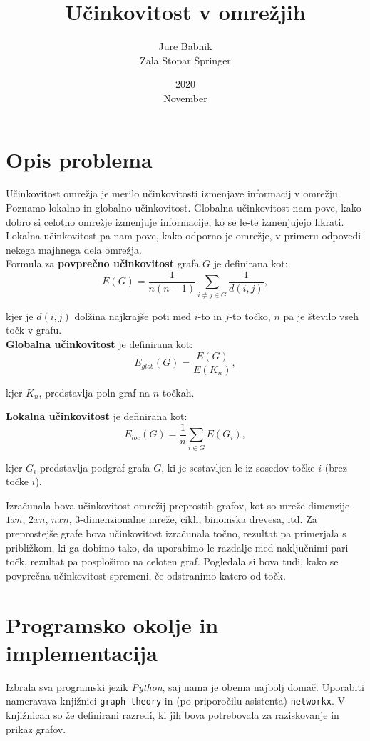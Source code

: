\documentclass[a4paper, 16pt]{article}
\title{Učinkovitost v omrežjih}
\date{2020\\ November}
\author{Jure Babnik \\  Zala Stopar Špringer}
\begin{document}
\maketitle

\section{Opis problema}

Učinkovitost omrežja je merilo učinkovitosti izmenjave informacij v omrežju. Poznamo lokalno in globalno učinkovitost. Globalna učinkovitost nam pove, kako dobro si celotno omrežje
izmenjuje informacije, ko se le-te izmenjujejo hkrati. Lokalna učinkovitost pa nam pove, kako odporno je omrežje, v primeru odpovedi nekega majhnega dela omrežja.\\

Formula za \textbf{povprečno učinkovitost} grafa $G$ je definirana kot:
$$ E(G) = \frac{1}{n(n-1)} \sum_{i\neq j \in G} \frac{1}{d(i,j)},$$

kjer je $d(i,j)$ dolžina najkrajše poti med $i$-to in $j$-to točko, $n$ pa je število vseh točk v grafu.\\

\textbf{Globalna učinkovitost} je definirana kot:
$$ E_{glob}(G) = \frac{E(G)}{E(K_n)}, $$

kjer $K_n$, predstavlja poln graf na $n$ točkah.


\textbf{Lokalna učinkovitost} je definirana kot:
$$ E_{loc}(G) = \frac{1}{n} \sum_{i \in G} E(G_i), $$

kjer $G_i$ predstavlja podgraf grafa $G$, ki je sestavljen le iz sosedov točke $i$ (brez točke $i$).

Izračunala bova učinkovitost omrežij preprostih grafov, kot so mreže dimenzije $1 x n$, $2 x n$, $n x n$, 3-dimenzionalne mreže, cikli, binomska drevesa, itd.
Za preprostejše grafe bova učinkovitost izračunala točno, rezultat pa primerjala s približkom, ki ga dobimo tako, da uporabimo le razdalje med naključnimi pari točk, 
rezultat pa posplošimo na celoten graf. Pogledala si bova tudi, kako se povprečna učinkovitost spremeni, če odstranimo katero od točk. 

\section{Programsko okolje in implementacija}

Izbrala sva programski jezik \emph{Python}, saj nama je obema najbolj domač. Uporabiti nameravava knjižnici \texttt{graph-theory} in (po priporočilu asistenta) \texttt{networkx}.
V knjižnicah so že definirani razredi, ki jih bova potrebovala za raziskovanje in prikaz grafov. 
\end{document}
